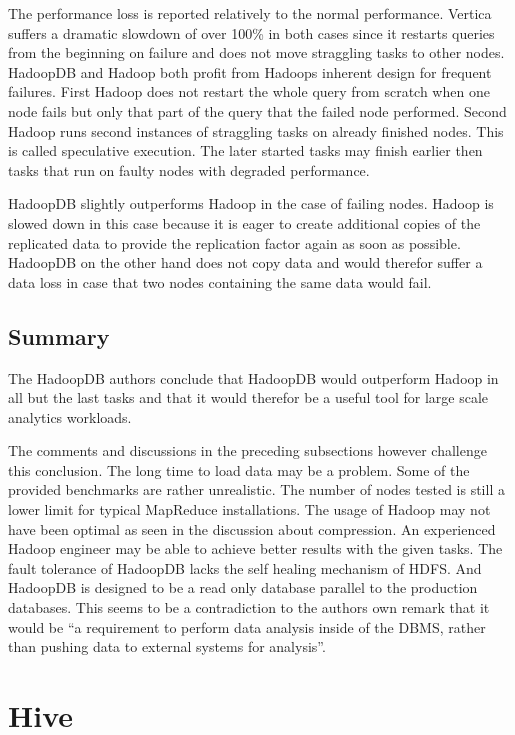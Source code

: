 \documentclass[12pt,a4paper]{scrartcl}		%
\begin{document}
The performance loss is reported relatively to the normal performance. Vertica suffers a dramatic slowdown of over 100\% in both cases since it restarts queries from the beginning on failure and does not move straggling tasks to other nodes. HadoopDB and Hadoop both profit from Hadoops inherent design for frequent failures. First Hadoop does not restart the whole query from scratch when one node fails but only that part of the query that the failed node performed. Second Hadoop runs second instances of straggling tasks on already finished nodes. This is called speculative execution. The later started tasks may finish earlier then tasks that run on faulty nodes with degraded performance.

HadoopDB slightly outperforms Hadoop in the case of failing nodes. Hadoop is slowed down in this case because it is eager to create additional copies of the replicated data to provide the replication factor again as soon as possible. HadoopDB on the other hand does not copy data and would therefor suffer a data loss in case that two nodes containing the same data would fail.

\subsection{Summary}
The HadoopDB authors conclude that HadoopDB would outperform Hadoop in all but the last tasks and that it would therefor be a useful tool for large scale analytics workloads.

 The comments and discussions in the preceding subsections however challenge this conclusion. The long time to load data may be a problem. Some of the provided benchmarks are rather unrealistic. The number of nodes tested is still a lower limit for typical MapReduce installations. The usage of Hadoop may not have been optimal as seen in the discussion about compression. An experienced Hadoop engineer may be able to achieve better results with the given tasks. The fault tolerance of HadoopDB lacks the self healing mechanism of HDFS. And HadoopDB is designed to be a read only database parallel to the production databases. This seems to be a contradiction to the authors own remark that it would be ``a requirement to perform data analysis inside of the DBMS, rather than pushing data to external systems for analysis''.

\section{Hive}
\end{document}
